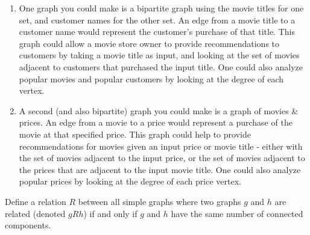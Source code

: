 \documentclass{article}
\begin{document}
\begin{enumerate}
    \item One graph you could make is a bipartite graph using the movie titles for one set, and customer names for the other set. An edge from a movie title to a customer name would represent the customer's purchase of that title. This graph could allow a movie store owner to provide recommendations to customers by taking a movie title as input, and looking at the set of movies adjacent to customers that purchased the input title. One could also analyze popular movies and popular customers by looking at the degree of each vertex.
    \item A second (and also bipartite) graph you could make is a graph of movies \& prices. An edge from a movie to a price would represent a purchase of the movie at that specified price. This graph could help to provide recommendations for movies given an input price or movie title - either with the set of movies adjacent to the input price, or the set of movies adjacent to the prices that are adjacent to the input movie title. One could also analyze popular prices by looking at the degree of each price vertex.
\end{enumerate}


\collab{} 

Define a relation $R$ between all simple graphs where two graphs $g$ and $h$ are
related (denoted $gRh$) if and only if $g$ and $h$ have the same number of
connected components.
\end{document}
